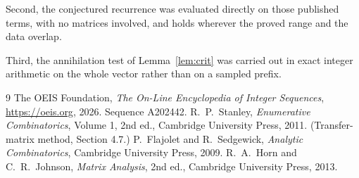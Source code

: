 \documentclass[11pt,a4paper]{article}
\theoremstyle{plain}
\theoremstyle{definition}
\begin{document}
Second, the conjectured recurrence was evaluated directly on those published terms, with no
matrices involved, and holds wherever the proved range and the data overlap.

Third, the annihilation test of Lemma~\ref{lem:crit} was carried out in exact integer
arithmetic on the whole vector rather than on a sampled prefix.

\begin{thebibliography}{9}
 The OEIS Foundation, \emph{The On-Line Encyclopedia of Integer
Sequences}, \url{https://oeis.org}, 2026. Sequence A202442.
 R.~P.~Stanley, \emph{Enumerative Combinatorics}, Volume 1, 2nd ed.,
Cambridge University Press, 2011. (Transfer-matrix method, Section 4.7.)
 P.~Flajolet and R.~Sedgewick, \emph{Analytic Combinatorics}, Cambridge
University Press, 2009.
 R.~A.~Horn and C.~R.~Johnson, \emph{Matrix Analysis}, 2nd ed., Cambridge
University Press, 2013.
\end{thebibliography}
\end{document}
